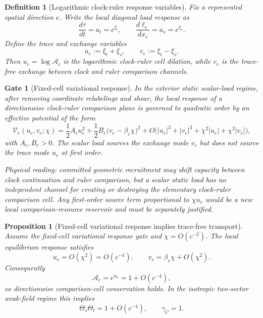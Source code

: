 \documentclass[11pt]{article}
\newtheorem{proposition}[theorem]{Proposition}
\newtheorem{definition}[theorem]{Definition}
\newtheorem{gate}[theorem]{Gate}
\theoremstyle{remark}
\begin{document}
\begin{definition}[Logarithmic clock-ruler response variables]
\label{def:log-response-variables}
Fix a represented spatial direction \(e\).  Write the local diagonal load response as
\[
        \frac{d\tau}{dt}=a_t=e^{\xi_t},
        \qquad
        \frac{d\ell_e}{dx_e}=a_s=e^{\xi_s}.
\]
Define the trace and exchange variables
\[
        u_e:=\xi_t+\xi_s,
        \qquad
        v_e:=\xi_t-\xi_s.
\]
Then \(u_e=\log\mathcal A_e\) is the logarithmic clock-ruler cell dilation, while \(v_e\) is the trace-free exchange between clock and ruler comparison channels.
\end{definition}

\begin{gate}[Fixed-cell variational response]
\label{gate:fixed-cell-variational-response}
In the exterior static scalar-load regime, after removing coordinate relabelings and shear, the local response of a directionwise clock-ruler comparison plane is governed to quadratic order by an effective potential of the form
\[
        \mathcal V_e(u_e,v_e;\chi)
        =
        \frac12 A_e u_e^2
        +\frac12 B_e\bigl(v_e-\beta_e\chi\bigr)^2
        +O\bigl(|u_e|^3+|v_e|^3+\chi^2|u_e|+\chi^2|v_e|\bigr),
\]
with \(A_e,B_e>0\).  The scalar load sources the exchange mode \(v_e\) but does not source the trace mode \(u_e\) at first order.

Physical reading: committed geometric recruitment may shift capacity between clock continuation and ruler comparison, but a scalar static load has no independent channel for creating or destroying the elementary clock-ruler comparison cell.  Any first-order source term proportional to \(\chi u_e\) would be a new local comparison-resource reservoir and must be separately justified.
\end{gate}

\begin{proposition}[Fixed-cell variational response implies trace-free transport]
\label{prop:fixed-cell-implies-trace-free}
Assume the fixed-cell variational response gate and \(\chi=O(c^{-2})\).  The local equilibrium response satisfies
\[
        u_e=O(\chi^2)=O(c^{-4}),
        \qquad
        v_e=\beta_e\chi+O(\chi^2).
\]
Consequently
\[
        \mathcal A_e=e^{u_e}=1+O(c^{-4}),
\]
so directionwise comparison-cell conservation holds.  In the isotropic two-sector weak-field regime this implies
\[
        \Theta_s\Theta_t=1+O(c^{-4}),
        \qquad
        \gamma_C=1.
\]
\end{proposition}
\end{document}

